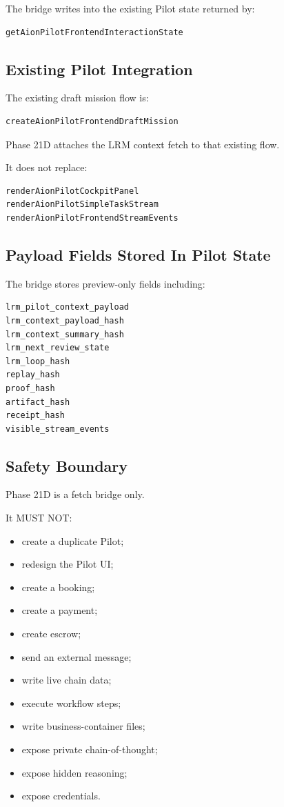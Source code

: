 The bridge writes into the existing Pilot state returned by:

\begin{verbatim}
getAionPilotFrontendInteractionState
\end{verbatim}

\subsection{Existing Pilot Integration}

The existing draft mission flow is:

\begin{verbatim}
createAionPilotFrontendDraftMission
\end{verbatim}

Phase 21D attaches the LRM context fetch to that existing flow.

It does not replace:

\begin{verbatim}
renderAionPilotCockpitPanel
renderAionPilotSimpleTaskStream
renderAionPilotFrontendStreamEvents
\end{verbatim}

\subsection{Payload Fields Stored In Pilot State}

The bridge stores preview-only fields including:

\begin{verbatim}
lrm_pilot_context_payload
lrm_context_payload_hash
lrm_context_summary_hash
lrm_next_review_state
lrm_loop_hash
replay_hash
proof_hash
artifact_hash
receipt_hash
visible_stream_events
\end{verbatim}

\subsection{Safety Boundary}

Phase 21D is a fetch bridge only.

It MUST NOT:

\begin{itemize}
  \item create a duplicate Pilot;
  \item redesign the Pilot UI;
  \item create a booking;
  \item create a payment;
  \item create escrow;
  \item send an external message;
  \item write live chain data;
  \item execute workflow steps;
  \item write business-container files;
  \item expose private chain-of-thought;
  \item expose hidden reasoning;
  \item expose credentials.
\end{itemize}

